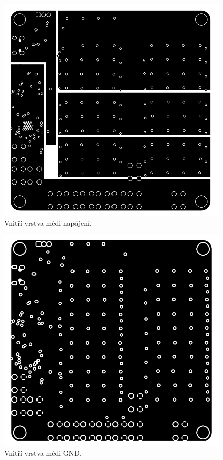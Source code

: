   \begin{figure}[!h]
    \begin{center}
      \includegraphics[scale=0.9]{prilohy/Verze1_vrstva_Cu_vnitrni_1.png}
    \end{center}
    \caption[Vnitří vrstva mědi napájení]{Vnitří vrstva mědi napájení.}
  \end{figure}

  \begin{figure}[!h]
    \begin{center}
      \includegraphics[scale=0.9]{prilohy/Verze1_vrstva_Cu_vnitrni_GND.png}
    \end{center}
    \caption[Vnitří vrstva mědi GND]{Vnitří vrstva mědi GND.}
  \end{figure}

